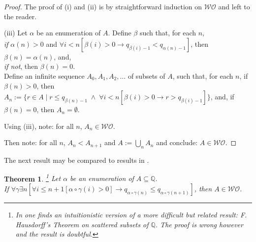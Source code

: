 \documentclass[a4paper]{amsart}
\theoremstyle{plain}
\newtheorem{theorem}{Theorem}
\begin{document}
 \begin{proof}  The proof of (i) and (ii) is by straightforward induction on $\mathcal{WO}$ and left to the reader.
 
 \smallskip
 
 (iii)  Let $\alpha$ be an enumeration of $A$.
 Define $\beta$ such that, for each $n$, \\\textit{if} $\alpha(n)>0$ and $\forall i<n[\beta(i)>0 \rightarrow q_{\beta(i)-1}<q_{\alpha(n)-1}]$, then $\beta(n)=\alpha(n)$, and, \\\textit{if not}, then $\beta(n) = 0$.
  \\Define an infinite sequence $A_0, A_1, A_2, \ldots$ of subsets of $A$, such that,  
 for each $n$, if $\beta(n)>0$,  then $A_n:=\{r \in A \mid r\le q_{\beta(n)-1}\; \wedge\;\forall i<n[\beta(i)>0\rightarrow r> q_{\beta(i)-1}]\}$, and, if $\beta(n)=0$, then $A_{n}=\emptyset$.
 
 Using (iii), note: for all $n$, $A_n \in \mathcal{WO}$.
 
 
 Then note: for all $n$, $A_n <A_{n+1}$ and $A:=\bigcup_n A_n$ and conclude: $A\in \mathcal{WO}$. 
 \end{proof}
 
 The next result may be compared to results in \cite[\S 5]{howard}.
 \begin{theorem}\label{T:wo}\footnote{In \cite[Section 4, Theorem 6]{veldman2008} one finds an intuitionistic version of a more difficult but related result: 
  F. Hausdorff's Theorem  on scattered subsets of $\mathbb{Q}$. The proof is wrong however and the result is doubtful.}   Let $\alpha$ be an enumeration of $A\subseteq \mathbb{Q}$.  \\If $\forall \gamma\exists n[\forall i\le n+1[\alpha\circ\gamma(i)>0]\rightarrow q_{\alpha\circ\gamma(n)}\le q_{\alpha\circ\gamma(n+1)}]$, then $A\in \mathcal{WO}$. \end{theorem}
 
\end{document}
